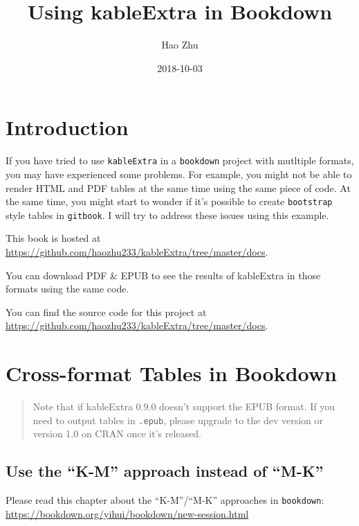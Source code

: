 \documentclass[]{book}
\title{Using kableExtra in Bookdown}
\author{Hao Zhu}
\date{2018-10-03}
\begin{document}
\maketitle

{
\setcounter{tocdepth}{1}
\tableofcontents
}
\hypertarget{introduction}{%
\chapter{Introduction}\label{introduction}}

If you have tried to use \texttt{kableExtra} in a \texttt{bookdown}
project with mutltiple formats, you may have experienced some problems.
For example, you might not be able to render HTML and PDF tables at the
same time using the same piece of code. At the same time, you might
start to wonder if it's possible to create \texttt{bootstrap} style
tables in \texttt{gitbook}. I will try to address these issues using
this example.

This book is hosted at
\url{https://github.com/haozhu233/kableExtra/tree/master/docs}.

You can download PDF \& EPUB to see the results of kableExtra in those
formats using the same code.

You can find the source code for this project at
\url{https://github.com/haozhu233/kableExtra/tree/master/docs}.

\hypertarget{cross-format-tables-in-bookdown}{%
\chapter{Cross-format Tables in
Bookdown}\label{cross-format-tables-in-bookdown}}

\begin{quote}
Note that if kableExtra 0.9.0 doesn't support the EPUB format. If you
need to output tables in \texttt{.epub}, please upgrade to the dev
version or version 1.0 on CRAN once it's released.
\end{quote}

\hypertarget{use-the-k-m-approach-instead-of-m-k}{%
\section{Use the ``K-M'' approach instead of
``M-K''}\label{use-the-k-m-approach-instead-of-m-k}}

Please read this chapter about the ``K-M''/``M-K'' approaches in
\texttt{bookdown}:
\url{https://bookdown.org/yihui/bookdown/new-session.html}
\end{document}
